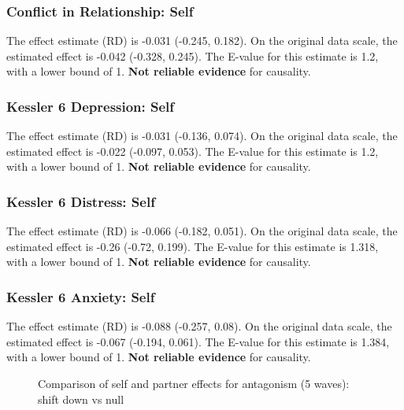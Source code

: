 \documentclass[
  singlecolumn]{article}
\begin{document}
\subsubsection{Conflict in Relationship:
Self}\label{conflict-in-relationship-self-11}

The effect estimate (RD) is -0.031 (-0.245, 0.182). On the original data
scale, the estimated effect is -0.042 (-0.328, 0.245). The E-value for
this estimate is 1.2, with a lower bound of 1. \textbf{Not reliable
evidence} for causality.

\subsubsection{Kessler 6 Depression:
Self}\label{kessler-6-depression-self-11}

The effect estimate (RD) is -0.031 (-0.136, 0.074). On the original data
scale, the estimated effect is -0.022 (-0.097, 0.053). The E-value for
this estimate is 1.2, with a lower bound of 1. \textbf{Not reliable
evidence} for causality.

\subsubsection{Kessler 6 Distress:
Self}\label{kessler-6-distress-self-11}

The effect estimate (RD) is -0.066 (-0.182, 0.051). On the original data
scale, the estimated effect is -0.26 (-0.72, 0.199). The E-value for
this estimate is 1.318, with a lower bound of 1. \textbf{Not reliable
evidence} for causality.

\subsubsection{Kessler 6 Anxiety: Self}\label{kessler-6-anxiety-self-11}

The effect estimate (RD) is -0.088 (-0.257, 0.08). On the original data
scale, the estimated effect is -0.067 (-0.194, 0.061). The E-value for
this estimate is 1.384, with a lower bound of 1. \textbf{Not reliable
evidence} for causality.

\begin{figure}


\caption{\label{fig-results-antagonism-self-partner-down-long-comparison}Comparison
of self and partner effects for antagonism (5 waves): shift down vs
null}

\end{figure}%
\end{document}

